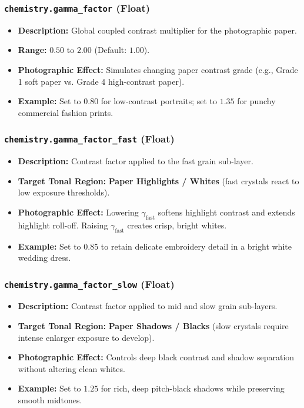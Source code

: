 \documentclass[11pt,a4paper]{article}
\begin{document}
\subsubsection{\texttt{chemistry.gamma\_factor} (Float)}
\begin{itemize}[leftmargin=*]
    \item \textbf{Description:} Global coupled contrast multiplier for the photographic paper.
    \item \textbf{Range:} $0.50$ to $2.00$ (Default: $1.00$).
    \item \textbf{Photographic Effect:} Simulates changing paper contrast grade (e.g., Grade 1 soft paper vs. Grade 4 high-contrast paper).
    \item \textbf{Example:} Set to $0.80$ for low-contrast portraits; set to $1.35$ for punchy commercial fashion prints.
\end{itemize}

\subsubsection{\texttt{chemistry.gamma\_factor\_fast} (Float)}
\begin{itemize}[leftmargin=*]
    \item \textbf{Description:} Contrast factor applied to the fast grain sub-layer.
    \item \textbf{Target Tonal Region:} \textbf{Paper Highlights / Whites} (fast crystals react to low exposure thresholds).
    \item \textbf{Photographic Effect:} Lowering $\gamma_{\text{fast}}$ softens highlight contrast and extends highlight roll-off. Raising $\gamma_{\text{fast}}$ creates crisp, bright whites.
    \item \textbf{Example:} Set to $0.85$ to retain delicate embroidery detail in a bright white wedding dress.
\end{itemize}

\subsubsection{\texttt{chemistry.gamma\_factor\_slow} (Float)}
\begin{itemize}[leftmargin=*]
    \item \textbf{Description:} Contrast factor applied to mid and slow grain sub-layers.
    \item \textbf{Target Tonal Region:} \textbf{Paper Shadows / Blacks} (slow crystals require intense enlarger exposure to develop).
    \item \textbf{Photographic Effect:} Controls deep black contrast and shadow separation without altering clean whites.
    \item \textbf{Example:} Set to $1.25$ for rich, deep pitch-black shadows while preserving smooth midtones.
\end{itemize}
\end{document}
